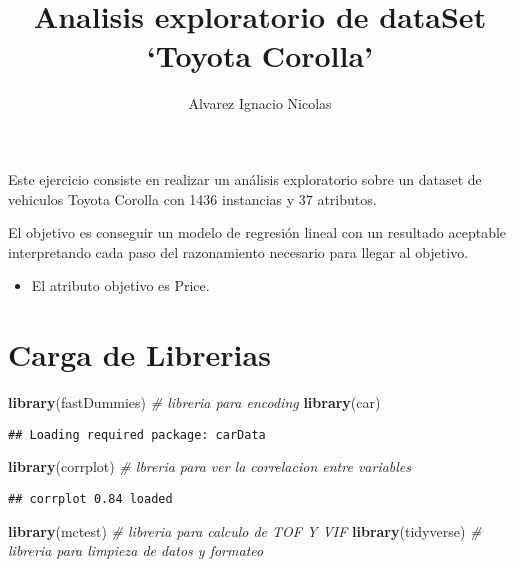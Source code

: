 \documentclass[]{article}
\title{Analisis exploratorio de dataSet `Toyota Corolla'}
\author{Alvarez Ignacio Nicolas}
\date{}
\newenvironment{Shaded}{\begin{snugshade}}{\end{snugshade}}
\newcommand{\CommentTok}[1]{\textcolor[rgb]{0.56,0.35,0.01}{\textit{#1}}}
\newcommand{\KeywordTok}[1]{\textcolor[rgb]{0.13,0.29,0.53}{\textbf{#1}}}
\newcommand{\NormalTok}[1]{#1}
\providecommand{\tightlist}{%
  \setlength{\itemsep}{0pt}\setlength{\parskip}{0pt}}
\begin{document}
\maketitle

{
\setcounter{tocdepth}{2}
\tableofcontents
}
Este ejercicio consiste en realizar un análisis exploratorio sobre un
dataset de vehiculos Toyota Corolla con 1436 instancias y 37 atributos.

El objetivo es conseguir un modelo de regresión lineal con un resultado
aceptable interpretando cada paso del razonamiento necesario para llegar
al objetivo.

\begin{itemize}
\tightlist
\item
  El atributo objetivo es Price.
\end{itemize}

\hypertarget{carga-de-librerias}{%
\section{Carga de Librerias}\label{carga-de-librerias}}

\begin{Shaded}
\begin{Highlighting}[]
\KeywordTok{library}\NormalTok{(fastDummies) }\CommentTok{# libreria para encoding}
\KeywordTok{library}\NormalTok{(car)}
\end{Highlighting}
\end{Shaded}

\begin{verbatim}
## Loading required package: carData
\end{verbatim}

\begin{Shaded}
\begin{Highlighting}[]
\KeywordTok{library}\NormalTok{(corrplot) }\CommentTok{# lbreria para ver la correlacion entre variables}
\end{Highlighting}
\end{Shaded}

\begin{verbatim}
## corrplot 0.84 loaded
\end{verbatim}

\begin{Shaded}
\begin{Highlighting}[]
\KeywordTok{library}\NormalTok{(mctest) }\CommentTok{# libreria para calculo de TOF Y VIF}
\KeywordTok{library}\NormalTok{(tidyverse) }\CommentTok{# libreria para limpieza de datos y formateo}
\end{Highlighting}
\end{Shaded}
\end{document}

